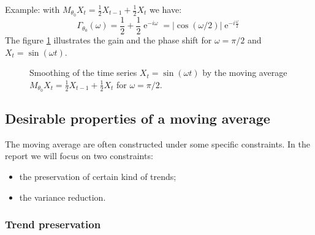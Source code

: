 \documentclass[
  12pt,
  ,
  a4paper]{article}
\DeclareMathOperator{\e}{e}
\newcommand\1{\mathds{1}}
\begin{document}
Example: with \(M_{\theta_0}X_t=\frac{1}{2}X_{t-1}+\frac{1}{2}X_{t}\) we have:
\[
\Gamma_{\theta_0}(\omega)=\frac{1}{2}+\frac{1}{2}\e^{-i\omega}
=\lvert\cos(\omega/2)\rvert\e^{-i\frac{\omega}{2}}
\]
The figure \ref{fig:exgainPhase} illustrates the gain and the phase shift for \(\omega=\pi/2\) and \(X_t=\sin(\omega t)\).

\begin{figure}[!ht]
\caption{Smoothing of the time series $X_t=\sin(\omega t)$ by the moving average $M_{\theta_0}X_t=\frac{1}{2}X_{t-1}+\frac{1}{2}X_{t}$ for $\omega=\pi/2$.}\label{fig:exgainPhase}
\end{figure}

\hypertarget{desirable-properties-of-a-moving-average}{%
\subsection{Desirable properties of a moving average}\label{desirable-properties-of-a-moving-average}}

The moving average are often constructed under some specific constraints.
In the report we will focus on two constraints:

\begin{itemize}
\item
  the preservation of certain kind of trends;
\item
  the variance reduction.
\end{itemize}

\hypertarget{trend-preservation}{%
\subsubsection{Trend preservation}\label{trend-preservation}}
\end{document}
